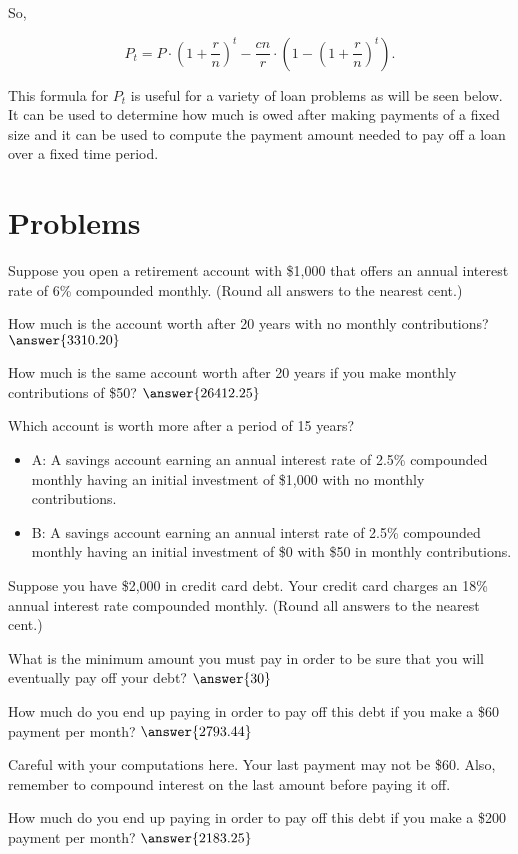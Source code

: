 \documentclass{ximera}
\begin{document}
So, 

\begin{fact}
  $$P_t = P\cdot\left(1+\frac{r}{n}\right)^t - \frac{cn}{r}\cdot\left(1-\left(1+\frac{r}{n}\right)^t\right).$$
\end{fact}

This formula for $P_t$ is useful for a variety of loan problems as will be seen below. It can be used to determine how much is owed after making payments of a fixed size and it can be used to compute the payment amount needed to pay off a loan over a fixed time period.

\section{Problems}

\begin{question}
Suppose you open a retirement account with \$1,000 that offers an annual interest rate of 6\% compounded monthly. (Round all answers to the nearest cent.)

How much is the account worth after 20 years with no monthly contributions? $\answer{3310.20}$

How much is the same account worth after 20 years if you make monthly contributions of \$50? $\answer{26412.25}$
\end{question}

\begin{question}
Which account is worth more after a period of 15 years?
\begin{itemize}
	\item A: A savings account earning an annual interest rate of 2.5\% compounded monthly having an initial investment of \$1,000 with no monthly contributions.
	\item B: A savings account earning an annual interst rate of 2.5\% compounded monthly having an initial investment of \$0 with \$50 in monthly contributions.
\end{itemize}
	\begin{multipleChoice}
	\end{multipleChoice}
\end{question}

\begin{question}
Suppose you have \$2,000 in credit card debt. Your credit card charges an 18\% annual interest rate compounded monthly. (Round all answers to the nearest cent.)

What is the minimum amount you must pay in order to be sure that you will eventually pay off your debt? $\answer{30}$

How much do you end up paying in order to pay off this debt if you make a \$60 payment per month? $\answer{2793.44}$
	\begin{hint}
	Careful with your computations here. Your last payment may not be \$60. Also, remember to compound interest on the last amount before paying it off.
	\end{hint}

How much do you end up paying in order to pay off this debt if you make a \$200 payment per month? $\answer{2183.25}$
\end{question}
\end{document}
